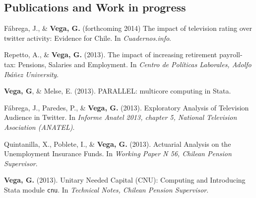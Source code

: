 \documentclass[letterpaper, 12pt]{article}
\renewenvironment{itemize}{
  \begin{list}{}{
    \setlength{\leftmargin}{0.45cm}
  }
}{
  \end{list}
}
\begin{document}
\subsection*{Publications and Work in progress}
\begin{itemize}
\item F\'abrega, J., \& {\bf Vega, G.} (forthcoming 2014) The impact of television rating over twitter activity: Evidence for Chile. In {\it Cuadernos.info}.
\item Repetto, A., \& {\bf Vega, G.} (2013). The impact of increasing retirement payroll-tax: Pensions, Salaries and Employment. In {\it Centro de Pol\'iticas Laborales, Adolfo Ib\'a\~nez University}.
\item {\bf Vega, G}, \& Melse, E. (2013). PARALLEL: multicore computing in Stata.
\item F\'abrega, J., Paredes, P., \& {\bf Vega, G.} (2013). Exploratory Analysis of Television Audience in Twitter. In {\it Informe Anatel 2013, chapter 5, National Television Asociation (ANATEL)}.
\item Quintanilla, X., Poblete, I., \& {\bf Vega, G.} (2013). Actuarial Analysis on the Unemployment Insurance Funds. In {\it Working Paper N 56, Chilean Pension Supervisor}.
\item {\bf Vega, G.} (2013). Unitary Needed Capital (CNU): Computing and Introducing Stata module {\tt cnu}. In {\it Technical Notes, Chilean Pension Supervisor}.
\end{itemize}
\end{document}
